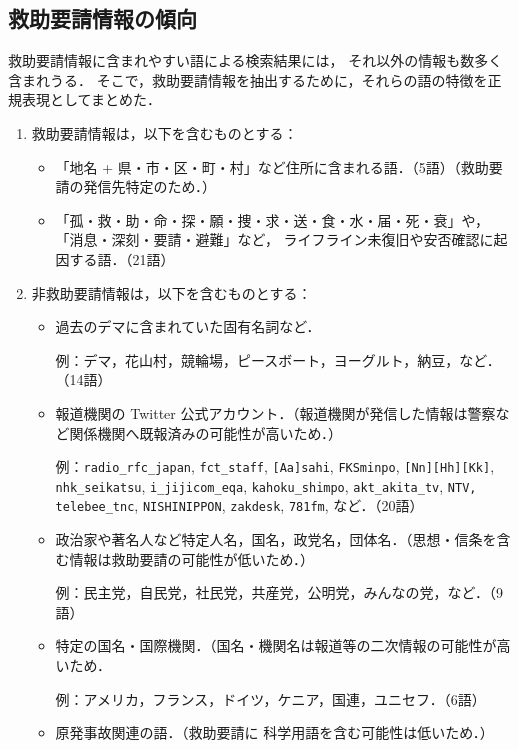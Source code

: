 \documentclass[japanese]{jnlp_1.4}
\begin{document}
\subsection{救助要請情報の傾向}
\label{key}

救助要請情報に含まれやすい語による検索結果には，
それ以外の情報も数多く含まれうる．
そこで，救助要請情報を抽出するために，それらの語の特徴を正規表現としてまとめた．

\begin{enumerate}
\item 救助要請情報は，以下を含むものとする：
  \begin{itemize}
  \item 
    「地名 + 県・市・区・町・村」など住所に含まれる語．{（5語）}（救助要請の発信先特定のため．）
  \item 
    「孤・救・助・命・探・願・捜・求・送・食・水・届・死・衰」や，
    「消息・深刻・要請・避難」など，
    ライフライン未復旧や安否確認に起因する語．{（21語）}
  \end{itemize}
\item 非救助要請情報は，以下を含むものとする：
  \begin{itemize}
  \item 過去のデマに含まれていた固有名詞{など．}

    {例：デマ，花山村，競輪場，ピースボート，ヨーグルト，納豆，など．（14語）}
  \item 報道機関の Twitter 公式アカウント．（報道機関{が発信した}情報は警察など関係機関へ既報済みの可能性が高いため．）

    {例：{\tt radio\_rfc\_japan}, {\tt fct\_staff}, {\tt [Aa]sahi}, {\tt FKSminpo}, {\tt [Nn][Hh][Kk]}, {\tt nhk\_seikatsu}, {\tt i\_jijicom\_eqa}, 
      {\tt kahoku\_shimpo}, {\tt akt\_akita\_tv}, {\tt NTV, telebee\_tnc}, {\tt NISHINIPPON}, {\tt zakdesk}, {\tt 781fm}, など．（20語）}
  \item 政治家や著名人など特定人名，国名，政党名，団体名．（思想・信条を含む情報は救助要請の可能性が低いため．）

    {例：民主党，自民党，社民党，共産党，公明党，みんなの党，など．（9語）}

  \item {特定の国名・国際機関．（国名・機関名は報道等の二次情報の可能性が高いため．}

    {例：アメリカ，フランス，ドイツ，ケニア，国連，ユニセフ．（6語）}
  \item 原発事故関連の語．（救助要請に
    科学用語を含む可能性は低いため．）
    

\end{itemize}
\end{enumerate}
\end{document}
